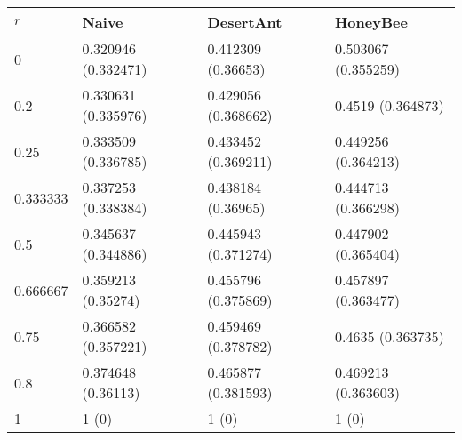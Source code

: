 \begin{tabular} {|l|l|l|l|}
\hline
$r$ & Naive & DesertAnt & HoneyBee \\
\hline
0 & 0.320946 (0.332471)  & 0.412309 (0.36653)  & 0.503067 (0.355259)  \\
0.2 & 0.330631 (0.335976)  & 0.429056 (0.368662)  & 0.4519 (0.364873)  \\
0.25 & 0.333509 (0.336785)  & 0.433452 (0.369211)  & 0.449256 (0.364213)  \\
0.333333 & 0.337253 (0.338384)  & 0.438184 (0.36965)  & 0.444713 (0.366298)  \\
0.5 & 0.345637 (0.344886)  & 0.445943 (0.371274)  & 0.447902 (0.365404)  \\
0.666667 & 0.359213 (0.35274)  & 0.455796 (0.375869)  & 0.457897 (0.363477)  \\
0.75 & 0.366582 (0.357221)  & 0.459469 (0.378782)  & 0.4635 (0.363735)  \\
0.8 & 0.374648 (0.36113)  & 0.465877 (0.381593)  & 0.469213 (0.363603)  \\
1 & 1 (0)  & 1 (0)  & 1 (0)  \\
\hline
\end{tabular}
